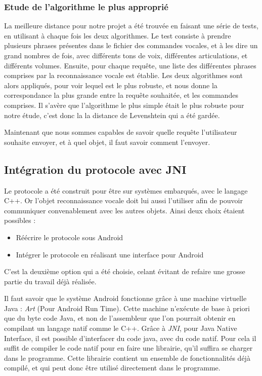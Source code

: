 \subsubsection{Etude de l'algorithme le plus approprié}
La meilleure distance pour notre projet a été trouvée en faisant une série de tests, en utilisant à chaque 
fois les deux algorithmes. Le test consiste à prendre plusieurs phrases présentes dans le fichier des 
commandes vocales, et à les dire un grand nombres de fois, avec différents tons de voix, différentes 
articulations, et différents volumes. Ensuite, pour chaque requête, une liste des différentes phrases 
comprises par la reconnaissance vocale est établie. Les deux algorithmes sont alors appliqués, pour voir 
lequel est le plus robuste, et nous donne la correspondance la plus grande entre la requête souhaitée, et les 
commandes comprises. Il s'avère que l'algorithme le plus simple  était le plus robuste pour notre étude, 
c'est donc la la distance de Levenshtein qui a été gardée. 

Maintenant que nous sommes capables de savoir quelle requête l'utilisateur souhaite envoyer, et à quel objet, 
il faut savoir comment l'envoyer.

	\subsection{Intégration du protocole avec JNI}
Le protocole a été construit pour être sur systèmes embarqués, avec le langage C++. Or l'objet reconnaissance 
vocale doit lui aussi l'utiliser afin de pouvoir communiquer convenablement avec les autres objets. Ainsi deux 
choix étaient possibles :
\begin{itemize}
 \item Réécrire le protocole sous Android
 \item Intégrer le protocole en réalisant une interface pour Android
\end{itemize}

C'est la deuxième option qui a été choisie, celant évitant de refaire une grosse partie du travail déjà 
réalisée.

Il faut savoir que le système Android fonctionne grâce à une machine virtuelle Java : \emph{Art} (Pour 
Android Run Time). Cette machine n'exécute de base à priori que du byte code Java, et non de l'assembleur que 
l'on pourrait obtenir en compilant un langage natif comme le C++. Grâce à \emph{JNI}, pour Java Native 
Interface, il est possible d'interfacer du code java, avec du code natif. Pour cela il suffit de compiler le 
code natif pour en faire une librairie, qu'il suffira se charger dans le programme. Cette librairie 
contient un ensemble de fonctionnalités déjà compilé, et qui peut donc être utilisé directement dans le 
programme.

